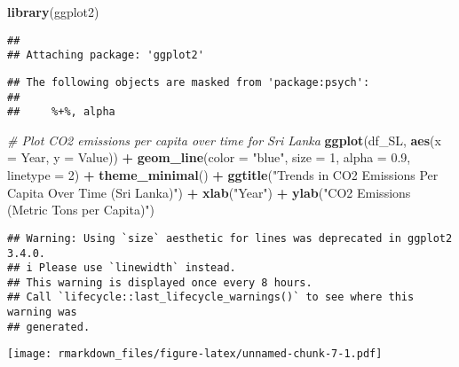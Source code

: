 \documentclass[
]{article}
\newenvironment{Shaded}{\begin{snugshade}}{\end{snugshade}}
\newcommand{\AttributeTok}[1]{\textcolor[rgb]{0.13,0.29,0.53}{#1}}
\newcommand{\CommentTok}[1]{\textcolor[rgb]{0.56,0.35,0.01}{\textit{#1}}}
\newcommand{\DecValTok}[1]{\textcolor[rgb]{0.00,0.00,0.81}{#1}}
\newcommand{\FloatTok}[1]{\textcolor[rgb]{0.00,0.00,0.81}{#1}}
\newcommand{\FunctionTok}[1]{\textcolor[rgb]{0.13,0.29,0.53}{\textbf{#1}}}
\newcommand{\NormalTok}[1]{#1}
\newcommand{\SpecialCharTok}[1]{\textcolor[rgb]{0.81,0.36,0.00}{\textbf{#1}}}
\newcommand{\StringTok}[1]{\textcolor[rgb]{0.31,0.60,0.02}{#1}}
\begin{document}
\begin{Shaded}
\begin{Highlighting}[]
\FunctionTok{library}\NormalTok{(ggplot2)}
\end{Highlighting}
\end{Shaded}

\begin{verbatim}
## 
## Attaching package: 'ggplot2'
\end{verbatim}

\begin{verbatim}
## The following objects are masked from 'package:psych':
## 
##     %+%, alpha
\end{verbatim}

\begin{Shaded}
\begin{Highlighting}[]
\CommentTok{\# Plot CO2 emissions per capita over time for Sri Lanka}
\FunctionTok{ggplot}\NormalTok{(df\_SL, }\FunctionTok{aes}\NormalTok{(}\AttributeTok{x =}\NormalTok{ Year, }\AttributeTok{y =}\NormalTok{ Value)) }\SpecialCharTok{+}
  \FunctionTok{geom\_line}\NormalTok{(}\AttributeTok{color =} \StringTok{"blue"}\NormalTok{, }\AttributeTok{size =} \DecValTok{1}\NormalTok{, }\AttributeTok{alpha =} \FloatTok{0.9}\NormalTok{, }\AttributeTok{linetype =} \DecValTok{2}\NormalTok{) }\SpecialCharTok{+}
  \FunctionTok{theme\_minimal}\NormalTok{() }\SpecialCharTok{+}
  \FunctionTok{ggtitle}\NormalTok{(}\StringTok{"Trends in CO2 Emissions Per Capita Over Time (Sri Lanka)"}\NormalTok{) }\SpecialCharTok{+}
  \FunctionTok{xlab}\NormalTok{(}\StringTok{"Year"}\NormalTok{) }\SpecialCharTok{+}
  \FunctionTok{ylab}\NormalTok{(}\StringTok{"CO2 Emissions (Metric Tons per Capita)"}\NormalTok{)}
\end{Highlighting}
\end{Shaded}

\begin{verbatim}
## Warning: Using `size` aesthetic for lines was deprecated in ggplot2 3.4.0.
## i Please use `linewidth` instead.
## This warning is displayed once every 8 hours.
## Call `lifecycle::last_lifecycle_warnings()` to see where this warning was
## generated.
\end{verbatim}

\texttt{[image: rmarkdown\_files/figure-latex/unnamed-chunk-7-1.pdf]}
\end{document}
